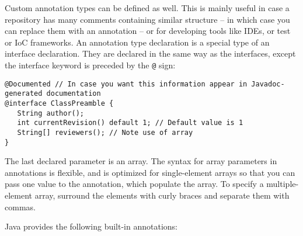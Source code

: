 \documentclass[8pt, table, xcdraw]{article}%
\begin{document}
Custom annotation types can be defined as well. This is mainly useful in case a repository has many comments containing similar structure -- in which case you can replace them with an annotation -- or for developing tools like IDEs, or test or IoC frameworks. An annotation type declaration is a special type of an interface declaration. They are declared in the same way as the interfaces, except the interface keyword is preceded by the \lstinline{@} sign:

\begin{lstlisting}
@Documented // In case you want this information appear in Javadoc-generated documentation
@interface ClassPreamble {
   String author();
   int currentRevision() default 1; // Default value is 1
   String[] reviewers(); // Note use of array
}
\end{lstlisting}

The last declared parameter is an array. The syntax for array parameters in annotations is flexible, and is optimized for single-element arrays so that you can pass one value to the annotation, which populate the array. To specify a multiple-element array, surround the elements with curly braces and separate them with commas.

Java provides the following built-in annotations:
\end{document}
